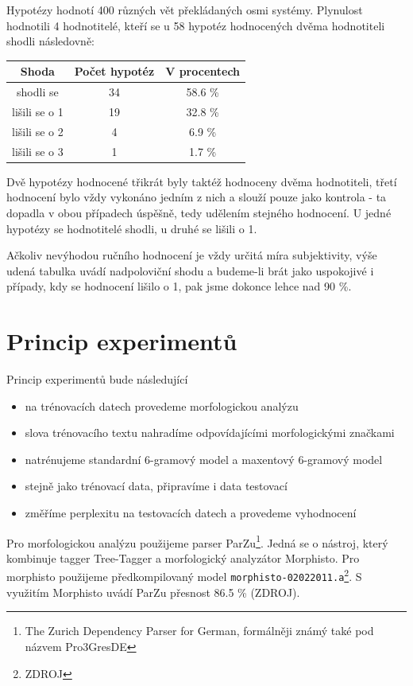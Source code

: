 \documentclass[12pt,a4paper]{report}
\begin{document}
Hypotézy hodnotí 400 různých vět překládaných osmi systémy. Plynulost hodnotili 4 hodnotitelé, kteří se u 58 hypotéz hodnocených dvěma hodnotiteli shodli následovně:

\begin{center}\begin{tabular}{|c|c|c|}
	\hline
	\textbf{Shoda} & \textbf{Počet hypotéz} & \textbf{V procentech}\\
	\hline
	shodli se & 34 & 58.6 \%\\
	\hline
	lišili se o 1 & 19 & 32.8 \%\\
	\hline
	lišili se o 2 & 4 & 6.9 \%\\
	\hline
	lišili se o 3 & 1 & 1.7 \%\\
	\hline
\end{tabular}\end{center}

Dvě hypotézy hodnocené třikrát byly taktéž hodnoceny dvěma hodnotiteli, třetí hodnocení bylo vždy vykonáno jedním z nich a slouží pouze jako kontrola - ta dopadla v obou případech úspěšně, tedy udělením stejného hodnocení. U jedné hypotézy se hodnotitelé shodli, u druhé se lišili o 1.

Ačkoliv nevýhodou ručního hodnocení je vždy určitá míra subjektivity, výše udená tabulka uvádí nadpoloviční shodu a budeme-li brát jako uspokojivé i případy, kdy se hodnocení lišilo o 1, pak jsme dokonce lehce nad 90 \%.

\section{Princip experimentů}

Princip experimentů bude následující
\begin{itemize}
\item{na trénovacích datech provedeme morfologickou analýzu}
\item{slova trénovacího textu nahradíme odpovídajícími morfologickými značkami}
\item{natrénujeme standardní 6-gramový model a maxentový 6-gramový model}
\item{stejně jako trénovací data, připravíme i data testovací}
\item{změříme perplexitu na testovacích datech a provedeme vyhodnocení}
\end{itemize}

Pro morfologickou analýzu použijeme parser ParZu\footnote{The Zurich Dependency Parser for German, formálněji známý také pod názvem Pro3GresDE}. Jedná se o nástroj, který kombinuje tagger Tree-Tagger a morfologický analyzátor Morphisto. Pro morphisto použijeme předkompilovaný model \texttt{morphisto-02022011.a}\footnote{ZDROJ}. S využitím Morphisto uvádí ParZu přesnost 86.5 \% (ZDROJ).
\end{document}
